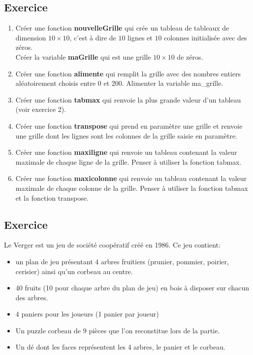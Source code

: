 \documentclass[11pt,a4paper]{article}
\newcounter{numexo}
\begin{document}
\subsection*{\Large Exercice \thenumexo }
\begin{enumerate}
\item Créer une fonction \textbf{nouvelleGrille} qui crée un tableau de tableaux de dimension $10 \times 10$, c'est à dire de $10$ lignes et $10$ colonnes initialisée avec des zéros.\\
Créer la variable \textbf{maGrille} qui est une grille $10 \times 10$ de zéros.
\item Créer une fonction \textbf{alimente} qui remplit la grille avec des nombres entiers aléatoirement choisis entre 0 et 200. Alimenter la variable ma\_grille.
\item Créer une fonction \textbf{tabmax} qui renvoie la plus grande valeur d'un tableau (voir exercice 2).
\item Créer une fonction \textbf{transpose} qui prend en paramètre une grille et renvoie une grille dont les lignes sont les colonnes de la grille saisie en paramètre.
\item Créer une fonction \textbf{maxiligne} qui renvoie un tableau contenant la valeur maximale de chaque ligne de la grille. Penser à utiliser la fonction tabmax.
\item Créer une fonction \textbf{maxicolonne} qui renvoie un tableau contenant la valeur maximale de chaque colonne de la grille. Penser à utiliser la fonction tabmax et la fonction transpose.
\end{enumerate}

\newpage
\addtocounter{numexo}{1}
\subsection*{\Large Exercice \thenumexo }
Le Verger est un jeu de société coopératif créé en 1986. Ce jeu contient:
\begin{itemize}
\item un plan de jeu présentant 4 arbres fruitiers (prunier, pommier, poirier, cerisier) ainsi qu'un corbeau au centre.
\item 40 fruits (10 pour chaque arbre du plan de jeu) en bois à disposer sur chacun des arbres.
\item 4 paniers pour les joueurs (1 panier par joueur)
\item Un puzzle corbeau de 9 pièces que l'on reconstitue lors de la partie.
\item Un dé dont les faces représentent les 4 arbres, le panier et le corbeau.
\end{itemize}
\end{document}
